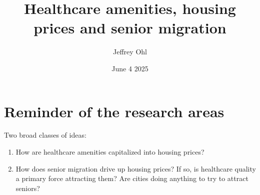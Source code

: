 \documentclass[11pt]{article}
\title{Healthcare amenities, housing prices and senior migration}
\author{Jeffrey Ohl}
\date{June 4 2025}
\begin{document}
\maketitle

\section{Reminder of the research areas}
Two broad classes of ideas:

\begin{enumerate}
\item How are healthcare amenities capitalized into housing prices? 
\item How does senior migration drive up housing prices? If so, is  healthcare quality a primary force attracting them? Are cities doing anything to try to attract seniors?
\end{enumerate}
\end{document}

